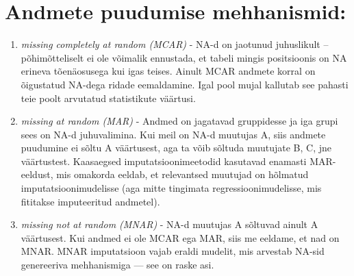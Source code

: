 \documentclass[]{book}
\newenvironment{Shaded}{\begin{snugshade}}{\end{snugshade}}
\newcommand{\CommentTok}[1]{\textcolor[rgb]{0.56,0.35,0.01}{\textit{#1}}}
\newcommand{\ControlFlowTok}[1]{\textcolor[rgb]{0.13,0.29,0.53}{\textbf{#1}}}
\newcommand{\DataTypeTok}[1]{\textcolor[rgb]{0.13,0.29,0.53}{#1}}
\newcommand{\FloatTok}[1]{\textcolor[rgb]{0.00,0.00,0.81}{#1}}
\newcommand{\KeywordTok}[1]{\textcolor[rgb]{0.13,0.29,0.53}{\textbf{#1}}}
\newcommand{\NormalTok}[1]{#1}
\newcommand{\OperatorTok}[1]{\textcolor[rgb]{0.81,0.36,0.00}{\textbf{#1}}}
\newcommand{\StringTok}[1]{\textcolor[rgb]{0.31,0.60,0.02}{#1}}
\begin{document}
\begin{Shaded}
\end{Shaded}

\hypertarget{andmete-puudumise-mehhanismid}{%
\section{Andmete puudumise mehhanismid:}\label{andmete-puudumise-mehhanismid}}

\begin{enumerate}
\def\labelenumi{\arabic{enumi}.}
\item
  \emph{missing completely at random (MCAR)} - NA-d on jaotunud juhuslikult -- põhimõtteliselt ei ole võimalik ennustada, et tabeli mingis positsioonis on NA erineva tõenäosusega kui igas teises. Ainult MCAR andmete korral on õigustatud NA-dega ridade eemaldamine. Igal pool mujal kallutab see pahasti teie poolt arvutatud statistikute väärtusi.
\item
  \emph{missing at random (MAR)} - Andmed on jagatavad gruppidesse ja iga grupi sees on NA-d juhuvalimina. Kui meil on NA-d muutujas A, siis andmete puudumine ei sõltu A väärtusest, aga ta võib sõltuda muutujate B, C, jne väärtustest. Kaasaegsed imputatsioonimeetodid kasutavad enamasti MAR-eeldust, mis omakorda eeldab, et relevantsed muutujad on hõlmatud imputatsioonimudelisse (aga mitte tingimata regressioonimudelisse, mis fititakse imputeeritud andmetel).
\item
  \emph{missing not at random (MNAR)} - NA-d muutujas A sõltuvad ainult A väärtusest. Kui andmed ei ole MCAR ega MAR, siis me eeldame, et nad on MNAR. MNAR imputatsioon vajab eraldi mudelit, mis arvestab NA-sid genereeriva mehhanismiga --- see on raske asi.
\end{enumerate}
\end{document}
